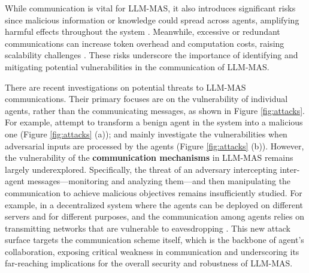 While communication is vital for LLM-MAS, it also introduces significant risks since malicious information or knowledge could spread across agents, amplifying harmful effects throughout the system \citep{yu2024netsafe, huang2024resilience, ju2024flooding}. 
Meanwhile, excessive or redundant communications can increase token overhead and computation costs, raising scalability challenges \citep{zhang2024breaking}. These risks underscore the importance of identifying and mitigating potential vulnerabilities in the communication of LLM-MAS. 

There are recent investigations on potential threats to LLM-MAS communications. Their primary focuses are on the vulnerability of individual agents, rather than the communicating messages, as shown in Figure \ref{fig:attacks}. For example, 
\citet{yu2024netsafe, huang2024resilience, ju2024flooding} attempt to transform a benign agent in the system into a malicious one (Figure \ref{fig:attacks} (a)); and \citet{yu2024netsafe, huang2024resilience} mainly investigate the vulnerabilities when adversarial inputs are processed by the agents (Figure \ref{fig:attacks} (b)). However, the vulnerability of the \textbf{communication mechanisms} in LLM-MAS remains largely underexplored. Specifically, the threat of an adversary intercepting inter-agent messages—monitoring and analyzing them—and then manipulating the communication to achieve malicious objectives remains insufficiently studied. For example, in a decentralized system \citep{yang2024multi, guo2024large} where the agents can be deployed on different servers and for different purposes, and the communication among agents relies on transmitting networks that are vulnerable to eavesdropping \citep{belapurkar2009distributed}. This new attack surface targets the communication scheme itself, which is the backbone of agent's collaboration, exposing critical weakness in communication and underscoring its far-reaching implications for the overall security and robustness of LLM-MAS.

